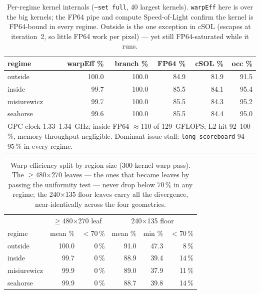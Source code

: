 \documentclass[
	english,
	letterpaper, oneside
]{article}
\begin{document}
\begin{table}[H]
    \centering
    \caption{Per-regime kernel internals (\texttt{--set full}, 40 largest
             kernels). \texttt{warpEff} here is over the big kernels; the FP64
             pipe and compute Speed-of-Light confirm the kernel is FP64-bound in
             every regime. Outside is the one exception in cSOL (escapes at
             iteration~2, so little FP64 work per pixel) --- yet still
             FP64-saturated while it runs.}
    \label{tab:sol}
    \begin{tabular}{lrrrrr}
        \hline
        regime & warpEff \% & branch \% & FP64 \% & cSOL \% & occ \% \\
        \hline
        outside     & 100.0 & 100.0 & 84.9 & 81.9 & 91.5 \\
        inside      & 99.7  & 100.0 & 85.5 & 84.1 & 95.4 \\
        misiurewicz & 99.7  & 100.0 & 85.5 & 84.3 & 95.2 \\
        seahorse    & 99.6  & 100.0 & 85.5 & 84.4 & 95.0 \\
        \hline
        \multicolumn{6}{l}{\footnotesize GPC clock 1.33--1.34~GHz; inside FP64 $\approx$110 of 129~GFLOPS; L2 hit 92--100\,\%, memory throughput negligible. Dominant issue stall: \texttt{long\_scoreboard} 94--95\,\% in every regime.}
    \end{tabular}
\end{table}

\begin{table}[H]
    \centering
    \caption{Warp efficiency split by region size (300-kernel warp pass). The
             $\ge$480$\times$270 leaves --- the ones that became leaves by
             passing the uniformity test --- never drop below 70\,\% in any
             regime; the 240$\times$135 floor leaves carry all the
             divergence, near-identically across the four geometries.}
    \label{tab:size}
    \begin{tabular}{lrrrrr}
        \hline
        & \multicolumn{2}{c}{$\ge$480$\times$270 leaf} & \multicolumn{3}{c}{240$\times$135 floor} \\
        regime & mean \% & $<$70\,\% & mean \% & min \% & $<$70\,\% \\
        \hline
        outside     & 100.0 & 0\,\% & 91.0 & 47.3 & 8\,\%  \\
        inside      & 99.7  & 0\,\% & 88.9 & 39.4 & 14\,\% \\
        misiurewicz & 99.9  & 0\,\% & 89.0 & 37.9 & 11\,\% \\
        seahorse    & 99.9  & 0\,\% & 88.7 & 39.8 & 14\,\% \\
        \hline
    \end{tabular}
\end{table}
\end{document}
